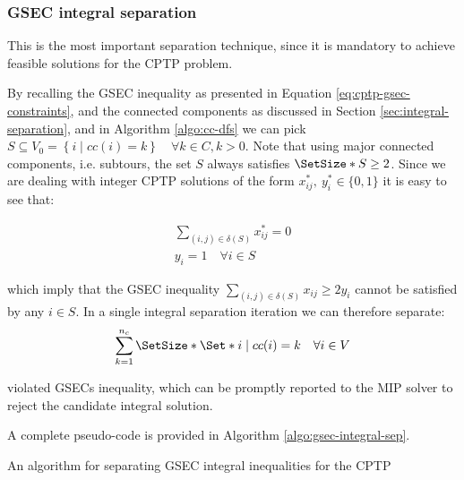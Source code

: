 \subsubsection{GSEC integral separation}
\label{sec:impl-gsec-integral-separation}

This is the most important separation technique, since it is mandatory to achieve feasible solutions for the CPTP problem.

By recalling the GSEC inequality as presented in Equation \eqref{eq:cptp-gsec-constraints}, and the connected components as discussed in Section \ref{sec:integral-separation}, and in Algorithm \ref{algo:cc-dfs} we can pick $S \subseteq V_0 = \left\{ i \mid cc(i) = k  \right\}   \quad \forall k \in C, k > 0$.
Note that using major connected components, i.e. subtours, the set $S$ always satisfies $\SetSize*{S} \ge 2$.
Since we are dealing with integer CPTP solutions of the form $x^*_{ij},\ y^*_{i} \in \{0, 1\}$ it is easy to see that:

\begin{align}
	\sum_{(i, j) \in \delta(S)} x^*_{ij} = 0 \\
	y_i =  1 \quad \forall i \in S
\end{align}

which imply that the GSEC inequality $\sum_{(i, j) \in \delta(S)} x_{ij} \ge 2 y_i$ cannot be satisfied by any $i \in S$.
In a single integral separation iteration we can therefore separate:
\begin{equation}
	\sum^{n_c}_{k = 1} \SetSize*{ \Set*{ i \mid cc(i) = k \quad \forall i \in V } }
\end{equation}

violated GSECs inequality, which can be promptly reported to the MIP solver to reject the candidate integral solution.

A complete pseudo-code is provided in Algorithm \ref{algo:gsec-integral-sep}.

\begin{algorithm}
	\caption{An algorithm for separating GSEC integral inequalities for the CPTP}
	\label{algo:gsec-integral-sep}
	
\end{algorithm}

